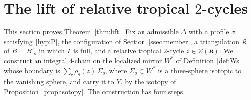 \section{The lift of relative tropical \texorpdfstring{$2$}{2}-cycles}\label{sec:lift}

This section proves Theorem~\ref{thm:lift}. Fix an admissible $\Delta$ with a profile $\sigma$ satisfying~\ref{hyp:P}, the
configuration of Section~\ref{ssec:member}, a triangulation $\mathfrak K$ of $B=B'_\sigma$ in which $\Gamma$ is full, and a
relative tropical $2$-cycle $z\in Z(\mathfrak K)$. We construct an integral $4$-chain on the localized mirror $W^*$ of
Definition~\ref{def:Ws} whose boundary is $\sum_q\rho_q(z)\,\Sigma_q$, where $\Sigma_q\subset W^*$ is a three-sphere
isotopic to the vanishing sphere, and carry it to $Y_t$ by the isotopy of Proposition~\ref{prop:isotopy}. The construction has four steps.

